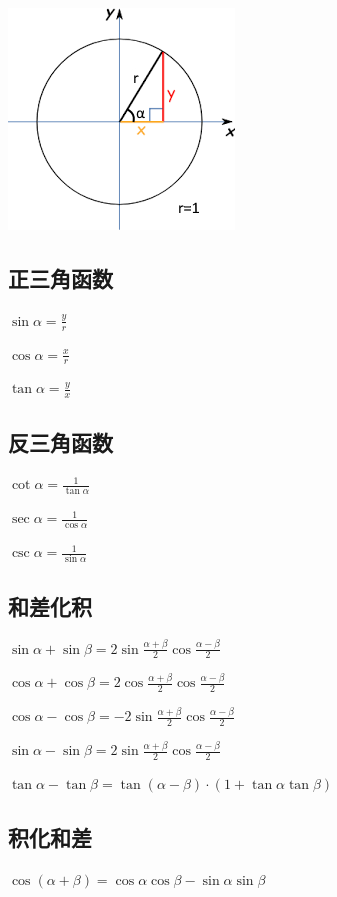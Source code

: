 \documentclass[UTF8]{ctexbook}
\begin{document}
{{\includegraphics{resources/UnitCircle.png}

\subsection{正三角函数}{
  $\sin{\alpha} = \frac{y}{r}$

  $\cos{\alpha} = \frac{x}{r}$

  $\tan{\alpha} = \frac{y}{x}$
}%

\subsection{反三角函数}{
  $\cot{\alpha} = \frac{1}{\tan{\alpha}}$

  $\sec{\alpha} = \frac{1}{\cos{\alpha}}$

  $\csc{\alpha} = \frac{1}{\sin{\alpha}}$
}%

\subsection{和差化积}{
  $\sin{\alpha}+\sin{\beta} = 2\sin{\frac{\alpha + \beta}{2}}\cos{\frac{\alpha - \beta}{2}}$

  $\cos{\alpha}+\cos{\beta} = 2\cos{\frac{\alpha + \beta}{2}\cos{\frac{\alpha-\beta}{2}}}$

  $\cos{\alpha}-\cos{\beta} = -2\sin{\frac{\alpha + \beta}{2}}\cos{\frac{\alpha - \beta}{2}}$

  $\sin{\alpha}-\sin{\beta} = 2\sin{\frac{\alpha + \beta}{2}}\cos{\frac{\alpha - \beta}{2}}$

  $\tan\alpha - \tan\beta = \tan(\alpha - \beta) \cdot (1 + \tan\alpha\tan\beta)$
}%

\subsection{积化和差}{
  $\cos(\alpha + \beta) = \cos{\alpha}\cos{\beta} - \sin{\alpha}\sin{\beta}$

}}}
\end{document}
